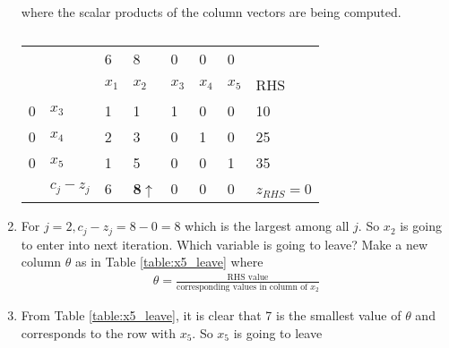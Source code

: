 \documentclass[journal,12pt,twocolumn]{IEEEtran}
\begin{document}
\begin{enumerate}[1.]
\begin{align}
\end{align}
%
where the scalar products of the column vectors are being computed.
%
\begin{table}[!h]
\begin{center}
\begin{tabular}{l  l | l l l l l | l }
                 & & 6 & 8 & 0 & 0 & 0 & \\
                 & & $x_1$ & $x_2$ & $x_3$ & $x_4$ & $x_5$  & RHS \\
\hline
0 & $x_3$ & 1 & 1 & 1 & 0 & 0 & 10   \\
0 & $x_4$ & 2 & 3 & 0 & 1 & 0 & 25 \\
0 & $x_5$ & 1 & 5 & 0 & 0 & 1 & 35\\
\hline
&$c_j-z_j$ & 6 &  \textbf{8}$\uparrow$ & 0 & 0 & 0 & $z_{RHS}=$0 \\
\end{tabular}
\end{center}
\caption{}
\label{table:x2_enter}
\end{table}
%
\item 
For $j=2, c_j-z_j = 8-0 = 8 $ which is the largest among all $j$. So $x_2$ is going to enter into next iteration.
Which variable is going to leave?
Make a new column $\theta$ as in Table \ref{table:x5_leave}  where
\begin{align}
\theta = \frac{\text{RHS value}}{\text{corresponding values in column of }x_2}
\end{align} 
\begin{table}[!h]
\begin{center}
\end{center}
\caption{}
\label{table:x5_leave}
\end{table}
\item From Table \ref{table:x5_leave}, it is clear that   7 is the smallest value of $\theta$ and corresponds to the row with $x_5$.  So $x_5$ is going to leave

\end{enumerate}
\end{document}

